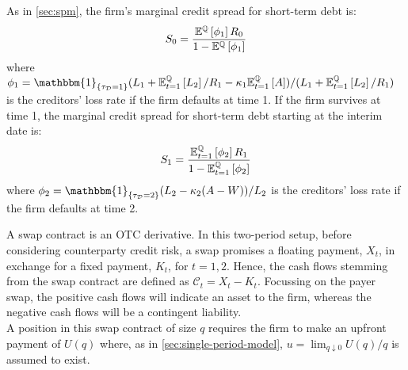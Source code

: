 \documentclass[main.tex]{subfiles}
\begin{document}
        As in \cref{sec:spm}, the firm's marginal credit spread for short-term debt is:
        \begin{equation}
            S_0 =
            \frac{
                \mathbb{E}^{\mathbb{Q}}\left[\phi_1\right]R_0
            }{
                1 - \mathbb{E}^{\mathbb{Q}}\left[\phi_1\right] 
            }
        \end{equation}
        where
        $\phi_1 = \mathbbm{1}_{\{\tau_{\mathcal{D}}=1\}} (L_{1}+\mathbb{E}_{t=1}^{\rnmeasure}\left[L_{2}\right]/R_1 - \kappa_{1}\mathbb{E}_{t=1}^{\rnmeasure}\left[A\right]) / (L_{1} + \mathbb{E}_{t=1}^{\rnmeasure}\left[L_{2}\right]/R_1)$ is the creditors' loss rate if the firm defaults at time 1. If the firm survives at time 1, the marginal credit spread for short-term debt starting at the interim date is:
        \begin{equation}
            S_1 =
            \frac{
                \mathbb{E}_{t=1}^{\mathbb{Q}}\left[\phi_2\right]R_1
            }{
                1 - \mathbb{E}_{t=1}^{\mathbb{Q}}\left[\phi_2\right] 
            }
        \end{equation}
        where $\phi_2 = \mathbbm{1}_{\{\tau_{\mathcal{D}}=2\}} (L_{2}-\kappa_{2}(A-W))/L_{2}$ is the creditors' loss rate if the firm defaults at time 2.

        A swap contract is an OTC derivative.
        In this two-period setup, before considering counterparty credit risk, a swap promises a floating payment, $X_t$, in exchange for a fixed payment, $K_t$, for $t = 1,2$.
        Hence, the cash flows stemming from the swap contract are defined as $\mathcal{C}_t = X_t - K_t$.
        Focussing on the payer swap, the positive cash flows will indicate an asset to the firm, whereas the negative cash flows will be a contingent liability.
        \\
        A position in this swap contract of size $q$ requires the firm to make an upfront payment of $U(q)$ where, as in \cref{sec:single-period-model}, $u = \lim_{q \downarrow 0} U(q)/q$ is assumed to exist.
\end{document}
